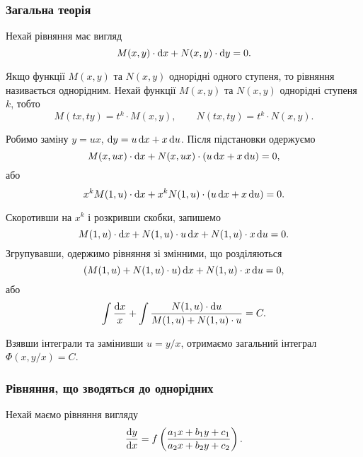 \subsubsection{Загальна теорія}
Нехай рівняння має вигляд
\begin{equation}
	\label{eq:1.2.1}
	M(x, y) \cdot \mathop{}\!\mathrm{d}	x + N(x, y) \cdot \mathop{}\!\mathrm{d} y = 0.
\end{equation}

Якщо функції $M(x, y)$ та $N(x, y)$ однорідні одного ступеня, то рівняння називається однорідним. Нехай функції $M(x, y)$ та $N(x, y)$ однорідні ступеня $k$, тобто
\begin{equation}
	\label{eq:1.2.2}
	M(t x, t y) = t^k \cdot M(x, y), \qquad N(t x, t y) = t^k \cdot N(x, y).
\end{equation}

Робимо заміну $y = u x$, $\mathop{}\!\mathrm{d} y = u \mathop{}\!\mathrm{d} x + x \mathop{}\!\mathrm{d} u$. Після підстановки одержуємо
\begin{equation}
	\label{eq:1.2.3}
	M(x, u x) \cdot \mathop{}\!\mathrm{d} x + N(x, u x) \cdot (u \mathop{}\!\mathrm{d} x + x \mathop{}\!\mathrm{d} u) = 0,
\end{equation}
або 
\begin{equation}
	\label{eq:1.2.4}
	x^k M(1, u) \cdot \mathop{}\!\mathrm{d} x + x^k N(1, u) \cdot (u \mathop{}\!\mathrm{d} x + x \mathop{}\!\mathrm{d} u) = 0.
\end{equation}

Скоротивши на $x^k$ і розкривши скобки, запишемо 
\begin{equation}
	\label{eq:1.2.5}
	M(1, u) \cdot \mathop{}\!\mathrm{d} x + N(1, u) \cdot u \mathop{}\!\mathrm{d} x + N(1, u) \cdot x \mathop{}\!\mathrm{d} u = 0.
\end{equation}
Згрупувавши, одержимо рівняння зі змінними, що розділяються
\begin{equation}
	\label{eq:1.2.6}
	(M(1, u) + N(1, u) \cdot u) \mathop{}\!\mathrm{d} x + N(1, u) \cdot x \mathop{}\!\mathrm{d} u = 0,
\end{equation}
або 
\begin{equation}
	\label{eq:1.2.7}
	\int \frac{\mathop{}\!\mathrm{d} x}{x} + \int \frac{N(1, u) \cdot \mathop{}\!\mathrm{d} u}{M(1, u) + N(1, u) \cdot u} = C.
\end{equation}

Взявши інтеграли та замінивши $u = y / x$, отримаємо загальний інтеграл $\Phi(x, y / x) = C$.

\subsubsection{Рівняння, що зводяться до однорідних}

Нехай маємо рівняння вигляду
\begin{equation}
	\label{eq:1.2.8}
	\frac{\mathop{}\!\mathrm{d} y}{\mathop{}\!\mathrm{d} x} = f \left( \frac{a_1 x + b_1 y + c_1}{a_2 x + b_2 y + c_2} \right).
\end{equation}

